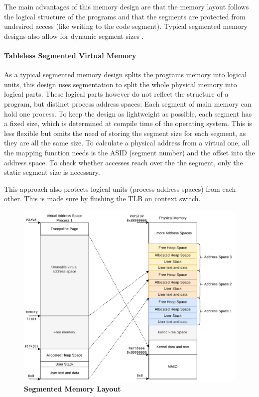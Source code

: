 The main advantages of this memory design are that the memory layout follows the logical structure of the programs and that the segments are protected from undesired access (like writing to the code segment).
Typical segmented memory designs also allow for dynamic segment sizes \cite{tanenbaumOS}.



\paragraph{Tableless Segmented Virtual Memory}
As a typical segmented memory design splits the programs memory into logical units, this design uses segmentation to split the whole physical memory into logical parts.
These logical parts however do not reflect the structure of a program, but distinct process address spaces: Each segment of main memory can hold one process.
To keep the design as lightweight as possible, each segment has a fixed size, which is determined at compile time of the operating system.
This is less flexible but omits the need of storing the segment size for each segment, as they are all the same size.
To calculate a physical address from a virtual one, all the mapping function needs is the ASID (segment number) and the offset into the address space.
To check whether accesses reach over the the segment, only the static segment size is necessary.

This approach also protects logical units (process address spaces) from each other. This is made sure
by flushing the TLB on context switch.



\begin{figure}[ht!]
    \centering
    \includegraphics[]{figures/segmented_layout.pdf}
    \caption[Segmented Memory Layout]{\textbf{Segmented Memory Layout}}
    \label{fig:theory:segLayout}
\end{figure}

